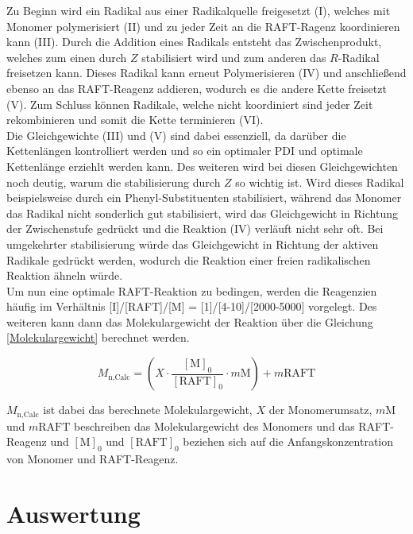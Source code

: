 \documentclass[10pt,a4paper,ngerman]{scrartcl}
\begin{document}
			Zu Beginn wird ein Radikal aus einer Radikalquelle freigesetzt (I), welches mit Monomer polymerisiert (II) und zu jeder Zeit an die RAFT-Ragenz koordinieren 
			kann (III). Durch die Addition eines Radikals entsteht das Zwischenprodukt, welches zum einen durch $Z$ stabilisiert wird und zum anderen das $R$-Radikal 
			freisetzen kann. Dieses Radikal kann erneut Polymerisieren (IV) und anschließend ebenso an das RAFT-Reagenz addieren, wodurch es die andere Kette freisetzt (V). 
			Zum Schluss können Radikale, welche nicht koordiniert sind jeder Zeit rekombinieren und somit die Kette terminieren (VI). \\
			Die Gleichgewichte (III) und (V) sind dabei essenziell, da darüber die Kettenlängen kontrolliert werden und so ein optimaler PDI und optimale Kettenlänge erziehlt 
			werden kann. Des weiteren wird bei diesen Gleichgewichten noch deutig, warum die stabilisierung durch $Z$ so wichtig ist. Wird dieses Radikal beispielsweise
			durch ein Phenyl-Substituenten stabilisiert, während das Monomer das Radikal nicht sonderlich gut stabilisiert, wird das Gleichgewicht in Richtung der 
			Zwischenstufe gedrückt und die Reaktion (IV) verläuft nicht sehr oft. Bei umgekehrter stabilisierung würde das Gleichgewicht in Richtung der aktiven Radikale 
			gedrückt werden, wodurch die Reaktion einer freien radikalischen Reaktion ähneln würde.\\
			Um nun eine optimale RAFT-Reaktion zu bedingen, werden die Reagenzien häufig im Verhältnis [I]/[RAFT]/[M] = [1]/[4-10]/[2000-5000] vorgelegt. Des weiteren kann 
			dann das Molekulargewicht der Reaktion über die Gleichung \eqref{Molekulargewicht} berechnet werden.

			\begin{equation}
				M_\text{n,Calc} = \left( X \cdot \frac{[\text{M}]_0}{[\text{RAFT}]_0} \cdot m\text{M}\right) + m\text{RAFT}
				\label{Molekulargewicht}
			\end{equation}

			$M_\text{n,Calc}$ ist dabei das berechnete Molekulargewicht, $X$ der Monomerumsatz, $m\text{M}$ und $m\text{RAFT}$ beschreiben das Molekulargewicht des Monomers
			und das RAFT-Reagenz und $[\text{M}]_0$ und $[\text{RAFT}]_0$ beziehen sich auf die Anfangskonzentration von Monomer und RAFT-Reagenz. \cite{polyskript}



\section{Auswertung}
\end{document}
